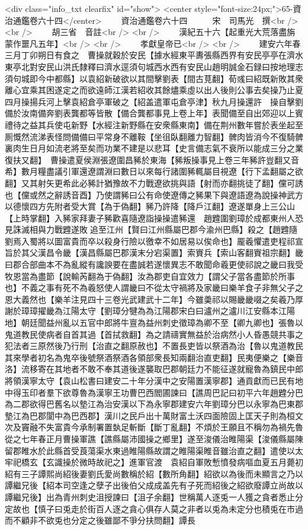<div class="info_txt clearfix" id="show">
<center style="font-size:24px;">65-資治通鑑卷六十四</center>
  　　資治通鑑卷六十四　　　宋　司馬光　撰<br />
<br />
　　胡三省　音註<br />
<br />
　　漢紀五十六【起重光大荒落盡旃蒙作噩凡五年】<br />
<br />
　　孝獻皇帝已<br />
<br />
　　建安六年春三月丁卯朔日有食之　曹操就穀於安民【據水經東平夀張縣西界有安民亭亭在濟水東亭北對安民山洪氏隸釋曰濟水逕須句城西水西有安民山趙明誠金石録曰按地理志須句城即今中都縣】以袁紹新破欲以其間擊劉表【間古莧翻】荀彧曰紹既新敗其衆離心宜乘其困遂定之而欲遠師江漢若紹收其餘燼乘虛以出人後則公事去矣操乃止夏四月操揚兵河上擊袁紹倉亭軍破之【紹盖遣軍屯倉亭津】秋九月操還許　操自擊劉備於汝南備奔劉表龔都等皆散【備合龔都事見上卷上年】表聞備至自出郊迎以上賓禮待之益其兵使屯新野【水經注新野縣在安衆縣東南】備在荆州數年嘗於表坐起至厠慨然流涕表怪問備備曰平常身不離鞍【坐徂臥翻離力智翻】髀肉皆消今不復騎髀裏肉生日月如流老將至矣而功業不建是以悲耳【史言備志氣不衰所以能成三分之業復扶又翻】　曹操遣夏侯淵張遼圍昌豨於東海【豨叛操事見上卷三年豨許豈翻又音希】數月糧盡議引軍還遼謂淵曰數日以來每行諸圍豨輒屬目視遼【行下孟翻屬之欲翻】又其射矢更希此必豨計猶豫故不力戰遼欲挑與語【射而亦翻挑徒了翻】儻可誘也【儻或然之辭誘音酉】乃使謂豨曰公有命使遼傳之豨果下與遼語遼為說操神武方以德懷四方先附者受大賞【為于偽翻】豨乃許降【降戶江翻】遼遂單身上三公山【上時掌翻】入豨家拜妻子豨歡喜隨遼詣操操遣豨還　趙韙圍劉璋於成都東州人恐見誅滅相與力戰韙遂敗追至江州【賢曰江州縣屬巴郡今渝州巴縣】殺之【趙韙隨劉焉入蜀將以圖富貴而卒以殺身行險以徼幸不如居易以俟命也】龎羲懼遣吏程祁宣旨於其父漢昌令畿【漢昌縣屬巴郡漢末分宕渠置】索賨兵【索山客翻賨祖宗翻】畿曰郡合部曲本不為亂縱有讒諛要在盡誠若遂懷異志不敢聞命羲更使祁說之畿曰我受牧恩當為盡節【說輸芮翻為于偽翻】汝為郡吏自宜效力【謂父子當各盡節於所事也】不義之事有死不為羲怒使人謂畿曰不從太守禍將及家畿曰樂羊食子非無父子之恩大義然也【樂羊注見四十三卷光武建武十二年】今雖羮祁以賜畿畿啜之矣羲乃厚謝於璋璋擢畿為江陽太守【劉璋分犍為為江陽郡宋白曰瀘州之瀘川江安縣本江陽地】朝廷聞益州亂以五官中郎將牛亶為益州刺史徵璋為卿不至【卿九卿也】張魯以鬼道教民使病者自首其過【首拭救翻】為之請禱實無益於治病然小人昏愚競共事之犯法者三原然後乃行刑【治直之翻原赦也】不置長吏皆以祭酒為治【魯以鬼道教民其來學者初名為鬼卒後號祭酒祭酒各領部衆長知兩翻治直吏翻】民夷便樂之【樂音洛】流移寄在其地者不敢不奉其道後遂襲取巴郡朝廷力不能征遂就寵魯為鎮民中郎將領漢寧太守【袁山松書曰建安二十年分漢中之安陽置漢寧郡】通貢獻而已民有地中得玉印者羣下欲尊魯為漢寧王功曹巴西閻圃諫曰【譙周巴記曰初平六年趙韙分巴為二郡欲得巴舊名以墊江為治安漢以下為永寧郡建安六年劉璋分巴以永寧為巴東郡墊江為巴郡閬中為巴西郡】漢川之民戶出十萬財富土沃四面險固上匡天子則為桓文次及竇融不失富貴今承制署置埶足斬斷【斷丁亂翻】不煩於王願且不稱勿為禍先魯從之七年春正月曹操軍譙【譙縣屬沛國操之鄉里】遂至浚儀治睢陽渠【浚儀縣屬陳留郡睢水於此縣首受莨蕩渠水東過睢陽縣故謂之睢陽渠睢音雖治直之翻】遣使以太牢祀橋玄【玄識操於微時故祀之】進軍官渡　袁紹自軍敗慙憤發病嘔血夏五月薨初紹有三子譚熙尚紹後妻劉氏愛尚數稱於紹【數所角翻】紹欲以為後而未顯言之乃以譚繼兄後【紹本司空逢之孽子出後伯父成成盖先有子死而紹後之紹欲廢譚立尚故以譚繼兄後】出為青州刺史沮授諫曰【沮子余翻】世稱萬人逐兎一人獲之貪者悉止分定故也【慎子曰兎走於街百人逐之貪心俱存人莫之非者以兎為未定分也積兎在市過而不顧非不欲兎也分定之後雖鄙不爭分扶問翻】譚長